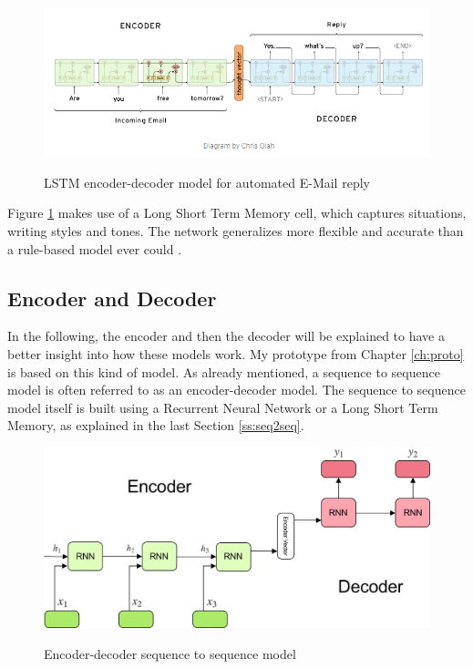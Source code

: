 \begin{figure}
	\begin{center}
		\includegraphics[width=5.5in]{photos/encoder_decoder}\\
		\caption{LSTM encoder-decoder model for automated E-Mail reply}\label{enc-dec}
	\end{center}
\end{figure}

Figure \ref{enc-dec} makes use of a Long Short Term Memory cell, which captures situations, writing styles and tones. The network generalizes more flexible and accurate than a rule-based model ever could \cite{google}. 


\subsection{Encoder and Decoder}\label{ss:encdec}

In the following, the encoder and then the decoder will be explained to have a better insight into how these models work. My prototype from Chapter \ref{ch:proto} is based on this kind of model. As already mentioned, a sequence to sequence model is often referred to as an encoder-decoder model. The sequence to sequence model itself is built using a Recurrent Neural Network or a Long Short Term Memory, as explained in the last Section \ref{ss:seq2seq}.

\begin{figure}
	\begin{center}
		\includegraphics[width=4.5in]{photos/encoderdecoder.jpeg}\\
		\caption{Encoder-decoder sequence to sequence model \cite{encdec}}\label{encdecseq}
	\end{center}
\end{figure}

